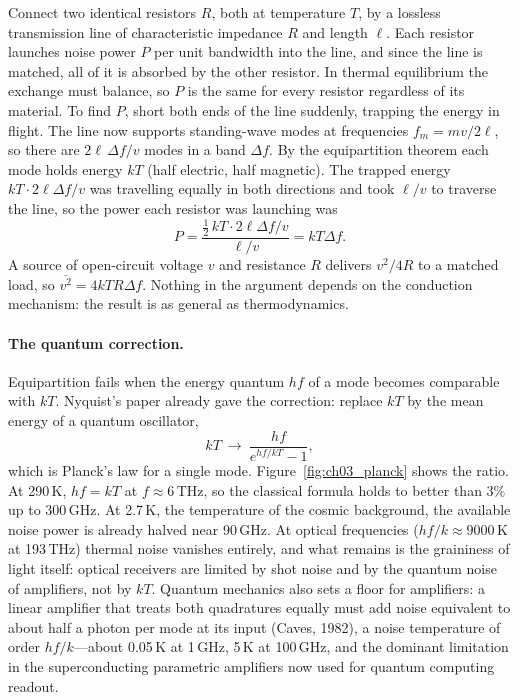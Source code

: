 \begin{deeper}
Connect two identical resistors $R$, both at temperature $T$, by a lossless transmission line of
characteristic impedance $R$ and length $\ell$. Each resistor launches noise power $P$ per unit
bandwidth into the line, and since the line is matched, all of it is absorbed by the other resistor.
In thermal equilibrium the exchange must balance, so $P$ is the same for every resistor regardless of
its material. To find $P$, short both ends of the line suddenly, trapping the energy in flight. The
line now supports standing-wave modes at frequencies $f_m=mv/2\ell$, so there are $2\ell\,\Delta f/v$
modes in a band $\Delta f$. By the equipartition theorem each mode holds energy $kT$ (half electric,
half magnetic). The trapped energy $kT\cdot2\ell\Delta f/v$ was travelling equally in both directions
and took $\ell/v$ to traverse the line, so the power each resistor was launching was
\[
P=\frac{\tfrac12\,kT\cdot2\ell\Delta f/v}{\ell/v}=kT\Delta f .
\]
A source of open-circuit voltage $v$ and resistance $R$ delivers $v^2/4R$ to a matched load, so
$\overline{v^2}=4kTR\Delta f$. Nothing in the argument depends on the conduction mechanism: the result
is as general as thermodynamics.
\end{deeper}


\paragraph{The quantum correction.} Equipartition fails when the energy quantum $hf$ of a mode becomes
comparable with $kT$. Nyquist's paper already gave the correction: replace $kT$ by the mean energy of a
quantum oscillator,
\begin{equation}
kT\ \longrightarrow\ \frac{hf}{e^{hf/kT}-1},
\label{eq:ch03:planck}
\end{equation}
which is Planck's law for a single mode. Figure~\ref{fig:ch03_planck} shows the ratio. At 290\,K,
$hf=kT$ at $f\approx6$\,THz, so the classical formula holds to better than 3\% up to 300\,GHz. At
2.7\,K, the temperature of the cosmic background, the available noise power is already halved near
90\,GHz. At optical frequencies ($hf/k\approx9000$\,K at 193\,THz) thermal noise vanishes entirely, and
what remains is the graininess of light itself: optical receivers are limited by shot noise and by the
quantum noise of amplifiers, not by $kT$. Quantum mechanics also sets a floor for amplifiers: a linear
amplifier that treats both quadratures equally must add noise equivalent to about half a photon per
mode at its input (Caves, 1982), a noise temperature of order $hf/k$---about 0.05\,K at 1\,GHz, 5\,K at
100\,GHz, and the dominant limitation in the superconducting parametric amplifiers now used for quantum
computing readout.

